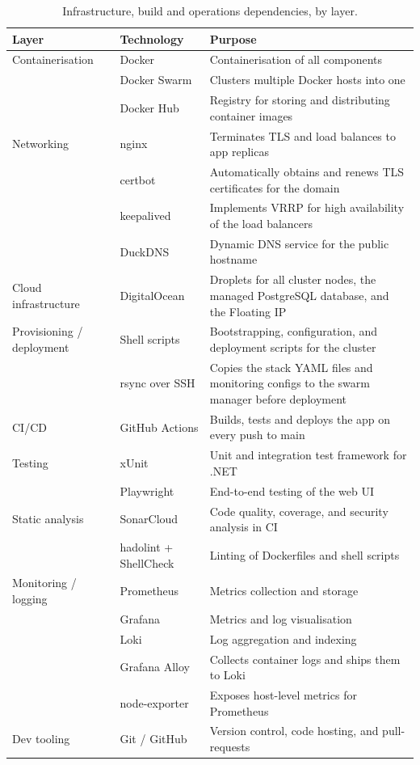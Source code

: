 \begin{table}[H]
    \centering
    \caption{Infrastructure, build and operations dependencies, by layer.}
    \label{tab:dependencies-infra}
    \small
    \begin{tabularx}{\linewidth}{l l X}
        \toprule
        \textbf{Layer} & \textbf{Technology} & \textbf{Purpose} \\
        \midrule
        Containerisation & Docker & Containerisation of all components \\
            & Docker Swarm & Clusters multiple Docker hosts into one \\
            & Docker Hub & Registry for storing and distributing container images \\
        \midrule
        Networking & nginx & Terminates TLS and load balances to app replicas \\
            & certbot & Automatically obtains and renews TLS certificates for the domain \\
            & keepalived & Implements VRRP for high availability of the load balancers \\
            & DuckDNS & Dynamic DNS service for the public hostname \\
        \midrule
        Cloud infrastructure & DigitalOcean & Droplets for all cluster nodes, the managed PostgreSQL database, and the Floating IP\\
        \midrule
        Provisioning / deployment & Shell scripts & Bootstrapping, configuration, and deployment scripts for the cluster \\
            & rsync over SSH & Copies the stack YAML files and monitoring configs to the swarm manager before deployment \\
        \midrule
        CI/CD & GitHub Actions & Builds, tests and deploys the app on every push to main \\
        \midrule
        Testing & xUnit & Unit and integration test framework for .NET \\
            & Playwright & End-to-end testing of the web UI \\
        \midrule
        Static analysis & SonarCloud & Code quality, coverage, and security analysis in CI \\
            & hadolint + ShellCheck & Linting of Dockerfiles and shell scripts \\
        \midrule
        Monitoring / logging & Prometheus & Metrics collection and storage \\
            & Grafana & Metrics and log visualisation \\
            & Loki & Log aggregation and indexing \\
            & Grafana Alloy & Collects container logs and ships them to Loki \\
            & node-exporter & Exposes host-level metrics for Prometheus \\
        \midrule
        Dev tooling & Git / GitHub & Version control, code hosting, and pull-requests \\
        \bottomrule
    \end{tabularx}
\end{table}

